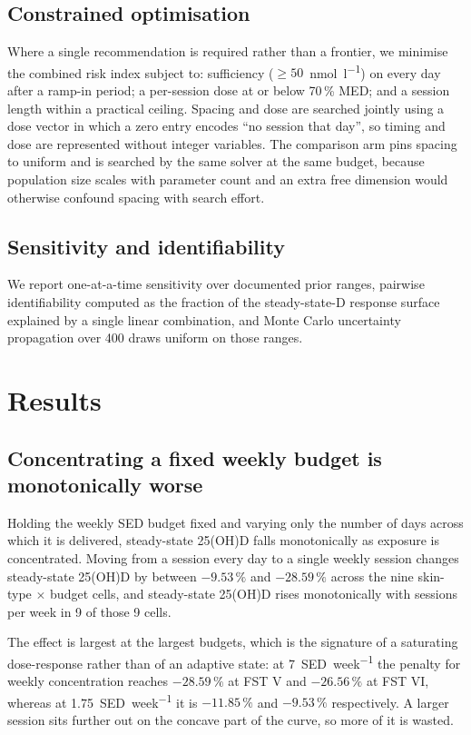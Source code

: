 \documentclass[11pt]{article}
\newcommand{\nmol}{\si{\nano\mole\per\litre}}
\newcommand{\SED}{SED}
\begin{document}
\subsection{Constrained optimisation}

Where a single recommendation is required rather than a frontier, we
minimise the combined risk index subject to: sufficiency
($\ge 50$~\nmol) on every day after a ramp-in period; a per-session
dose at or below 70\,\% MED; and a session length within a practical
ceiling. Spacing and dose are searched jointly using a dose vector in
which a zero entry encodes ``no session that day'', so timing and dose
are represented without integer variables. The comparison arm pins
spacing to uniform and is searched by the same solver at the same
budget, because population size scales with parameter count and an
extra free dimension would otherwise confound spacing with search
effort.

\subsection{Sensitivity and identifiability}

We report one-at-a-time sensitivity over documented prior ranges,
pairwise identifiability computed as the fraction of the
steady-state-D response surface explained by a single linear
combination, and Monte Carlo uncertainty propagation over 400 draws
uniform on those ranges.

\section{Results}

\subsection{Concentrating a fixed weekly budget is monotonically worse}

Holding the weekly \SED{} budget fixed and varying only the number of
days across which it is delivered, steady-state 25(OH)D falls
monotonically as exposure is concentrated. Moving from a session every
day to a single weekly session changes steady-state 25(OH)D by
between $-9.53\,\%$ and $-28.59\,\%$ across the nine skin-type
$\times$ budget cells, and steady-state 25(OH)D rises monotonically
with sessions per week in 9 of those 9 cells.

The effect is largest at the largest budgets, which is the signature
of a saturating dose-response rather than of an adaptive state: at
\SI{7}{\SED\per week} the penalty for weekly concentration reaches
$-28.59\,\%$ at FST V and $-26.56\,\%$ at FST VI, whereas at
\SI{1.75}{\SED\per week} it is $-11.85\,\%$ and $-9.53\,\%$
respectively. A larger session sits further out on the concave part of
the curve, so more of it is wasted.
\end{document}
